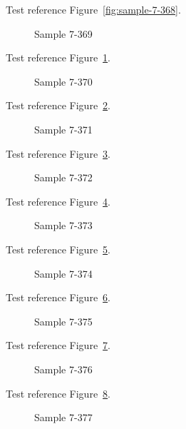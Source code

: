 Test reference Figure~\ref{fig:sample-7-368}.

\begin{figure}[tbhp]
\caption{Sample 7-369}
\label{fig:sample-7-369}
\end{figure}

Test reference Figure~\ref{fig:sample-7-369}.

\begin{figure}[tbhp]
\caption{Sample 7-370}
\label{fig:sample-7-370}
\end{figure}

Test reference Figure~\ref{fig:sample-7-370}.

\begin{figure}[tbhp]
\caption{Sample 7-371}
\label{fig:sample-7-371}
\end{figure}

Test reference Figure~\ref{fig:sample-7-371}.

\begin{figure}[tbhp]
\caption{Sample 7-372}
\label{fig:sample-7-372}
\end{figure}

Test reference Figure~\ref{fig:sample-7-372}.

\begin{figure}[tbhp]
\caption{Sample 7-373}
\label{fig:sample-7-373}
\end{figure}

Test reference Figure~\ref{fig:sample-7-373}.

\begin{figure}[tbhp]
\caption{Sample 7-374}
\label{fig:sample-7-374}
\end{figure}

Test reference Figure~\ref{fig:sample-7-374}.

\begin{figure}[tbhp]
\caption{Sample 7-375}
\label{fig:sample-7-375}
\end{figure}

Test reference Figure~\ref{fig:sample-7-375}.

\begin{figure}[tbhp]
\caption{Sample 7-376}
\label{fig:sample-7-376}
\end{figure}

Test reference Figure~\ref{fig:sample-7-376}.

\begin{figure}[tbhp]
\caption{Sample 7-377}
\label{fig:sample-7-377}
\end{figure}

